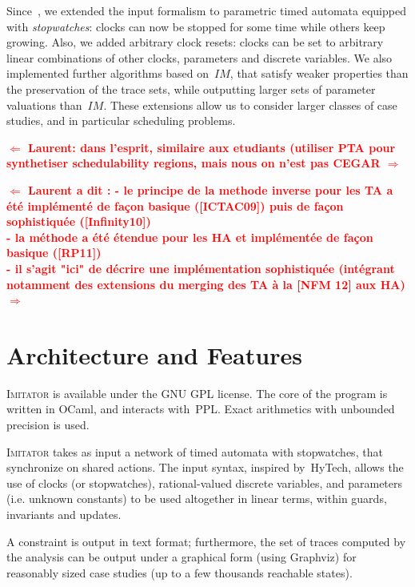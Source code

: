 \documentclass{llncs}
\newcommand{\IM}{\mathit{IM}}
\newcommand{\graphviz}{Graphviz}
\newcommand{\hytech}{{\sc HyTech}}
\newcommand{\imitator}{\textsc{Imitator}}
\newcommand{\commentaire}[1]{\textcolor{red}{\textbf{$\Leftarrow$  #1 $\Rightarrow$}}}
\begin{document}
Since~\cite{and10}, we extended the input formalism to parametric timed automata equipped with \emph{stopwatches}: clocks can now be stopped for some time while others keep growing.
Also, we added arbitrary clock resets: clocks can be set to arbitrary linear combinations of other clocks, parameters and discrete variables.
We also implemented further algorithms based on~$\IM$, that satisfy weaker properties than the preservation of the trace sets, while outputting larger sets of parameter valuations than~$\IM$.
These extensions allow us to consider larger classes of case studies, and in particular scheduling problems.

\commentaire{Laurent: dans l'esprit, similaire aux etudiants (utiliser PTA pour synthetiser schedulability regions, mais nous on n'est pas CEGAR}

\commentaire{Laurent a dit :
- le principe de la methode inverse pour les TA a été implémenté de façon basique ([ICTAC09])
puis de façon sophistiquée ([Infinity10])\\
- la méthode a été étendue pour les HA et implémentée de façon basique ([RP11])\\
- il s'agit "ici" de décrire une implémentation sophistiquée (intégrant notamment des extensions
du merging des TA  à la  [NFM 12] aux HA)
}

\section{Architecture and Features}

\imitator{} is available under the GNU GPL license.
The core of the program is written in OCaml, and interacts with~PPL.
Exact arithmetics with unbounded precision is used.

\imitator{} takes as input a network of timed automata with stopwatches, that synchronize on shared actions.
The input syntax, inspired by~\hytech{}, allows the use of clocks (or stopwatches), rational-valued discrete variables, and parameters (i.e. unknown constants) to be used altogether in linear terms, within guards, invariants and updates.

A constraint is output in text format; furthermore, the set of traces computed by the analysis can be output under a graphical form (using \graphviz{}) for reasonably sized case studies (up to a few thousands reachable states).
\end{document}
